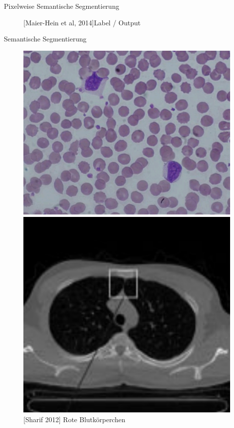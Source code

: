 \begin{frame}{Pixelweise Semantische Segmentierung}
\begin{figure}[ht]
\begin{minipage}[b]{0.45\linewidth}
            \caption{[Maier-Hein et al, 2014]\hspace{\textwidth}Label / Output}
            \label{fig:label}
        \end{minipage}
    \end{figure}
\end{frame}

\begin{frame}{Semantische Segmentierung}
    \begin{figure}[ht]
        \begin{minipage}[b]{0.45\linewidth}
            \centering
            \includegraphics[width=\textwidth]{../images/red-blood.png}
            \caption{[Sharif 2012] Rote Blutkörperchen}
            \label{fig:red-blood}
        \end{minipage}
        \hspace{0.5cm}
        \begin{minipage}[b]{0.45\linewidth}
            \centering
            \includegraphics[width=\textwidth]{../images/lung.png}

\end{minipage}
\end{figure}
\end{frame}
